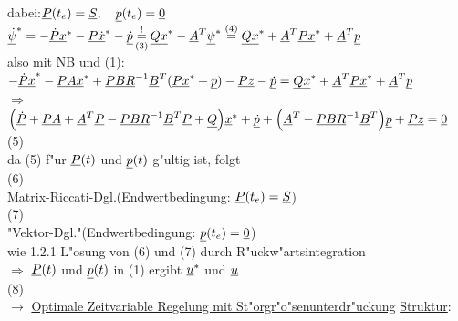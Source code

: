 \documentclass[openany,a4paper,11pt]{book}
\begin{document}
\flushleft dabei:\quad $\uline{P}(t_e)=\uline{S}, \quad \uline{p}(t_e)=\uline{0}$\\
$\uline{\dot{\psi}}^*=-\uline{\dot{P}}\uline{x}^*-\uline{P\dot{x}}^*-\uline{\dot{p}}\mathop{=}\limits_{(3)}^{!}\uline{Qx}^*-\uline{A}^T\uline{\psi}^*\stackrel{(4)}{=}\uline{Qx}^*+\uline{A}^T\uline{Px}^*+\uline{A}^T\uline{p}$\\
also mit NB und (1):\\
$-\uline{\dot{P}x}^*-\uline{PAx}^*+\uline{PBR}^{-1}\uline{B}^T(\uline{Px}^*+\uline{p})-\uline{Pz}-\uline{\dot{p}}=\uline{Qx}^*+\uline{A}^T\uline{Px}^*+\uline{A}^T\uline{p}$\\
$\Rightarrow$ $\Big(\uline{\dot{P}}+\uline{PA}+\uline{A}^T\uline{P}-\uline{PBR}^{-1}\uline{B}^T\uline{P}+\uline{Q}\Big)\uline{x}^*+\uline{\dot{p}}+\Big(\uline{A}^T-\uline{PBR}^{-1}\uline{B}^T\Big)\uline{p}+\uline{Pz}=\uline{0}$ \quad (5)\\
da (5) f"ur $\uline{P}(t)$ und $\uline{p}(t)$ g"ultig ist, folgt\\
 \quad (6)\\
Matrix-Riccati-Dgl.\quad (Endwertbedingung: $\uline{P}(t_e)=\uline{S}$)\\
 \quad (7)\\
"Vektor-Dgl."\quad (Endwertbedingung: $\uline{p}(t_e)=\uline{0}$)\\
wie 1.2.1 L"osung von (6) und (7) durch R"uckw"artsintegration\\
$\Rightarrow$ $\uline{P}(t)$ und $\uline{p}(t)$ in (1) ergibt $\uline{u}^*$ und $\uline{u}$\\
 \quad (8)\\
$\rightarrow$ \uline{Optimale Zeitvariable Regelung mit St"orgr"o"senunterdr"uckung}\clearpage
\uline{Struktur}:\\[6pt]
\end{document}
